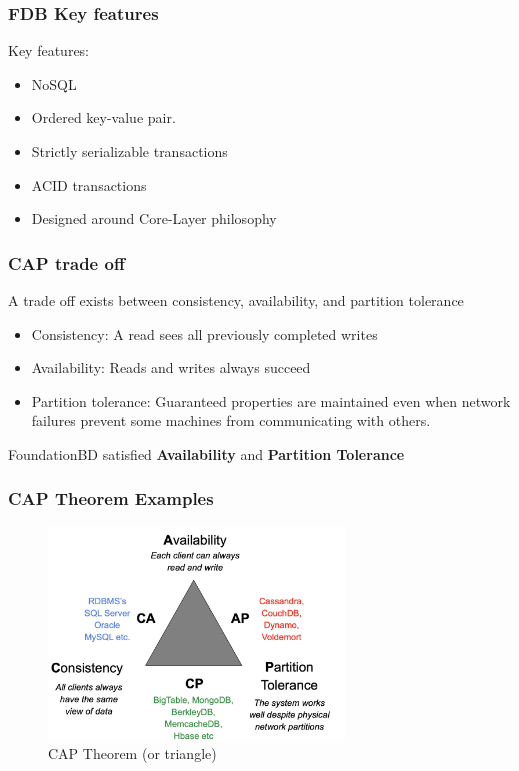 \begin{frame}
	\frametitle{FDB Key features}

Key features:
\begin{itemize}
    \item NoSQL
    \item Ordered key-value pair.
    \item Strictly serializable transactions
    \item ACID transactions
    \item Designed around Core-Layer philosophy 
    
\end{itemize}

\end{frame}
\begin{frame}
	\frametitle{CAP trade off}

A trade off exists between consistency, availability, and
partition tolerance
\begin{itemize}
    \item Consistency: A read sees all previously completed writes
    \item Availability: Reads and writes always succeed
    \item Partition tolerance: Guaranteed properties are maintained even when network failures prevent some machines from communicating with others.
    
\end{itemize}
FoundationBD satisfied \textbf{Availability} and \textbf{Partition Tolerance} 

\end{frame}
\begin{frame}
	\frametitle{CAP Theorem Examples}

\begin{figure}[h]
    \centering
    \includegraphics[width=0.7\textwidth]{img/1-Introduction/CAP theorem.png}
    \caption{CAP Theorem (or triangle)}
\end{figure}

\end{frame}

